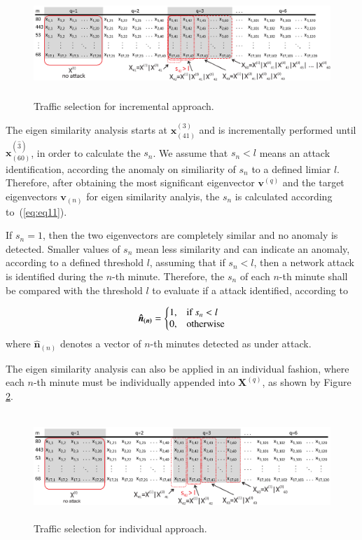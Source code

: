 \documentclass[review]{elsarticle}
\providecommand{\DIFaddtex}[1]{{\protect\color{blue}\uwave{#1}}} %
\providecommand{\DIFaddbegin}{} %
\providecommand{\DIFaddend}{} %
\providecommand{\DIFadd}[1]{\texorpdfstring{\DIFaddtex{#1}}{#1}} %
\begin{document}
\begin{figure}[h!]
     \includegraphics[height=4cm, width=12.4cm]{results/figures/incremental.eps}
     \caption{Traffic selection for incremental approach.}
     \label{fig:fig8}
\end{figure}

The eigen similarity analysis starts at $\boldsymbol{x}^{(3)}_{(41)}$ and is incrementally performed until $\boldsymbol{x}^{(\hat{3})}_{(60)}$, in order to calculate the $s_n$. We assume that $s_n < l$ means an attack identification, according the anomaly on similiarity of $s_n$ to a defined limiar $l$. Therefore, after obtaining the most significant eigenvector $\boldsymbol{v}^{(q)}$ and the target eigenvectors $\boldsymbol{v}_{(n)}$ for eigen similarity analyis, the $s_n$ is calculated according to~(\ref{eq:eq11}).

If $s_n = 1$, then the two eigenvectors are completely similar and no anomaly is detected. Smaller values of $s_n$ mean less similarity and can indicate an anomaly, according to a defined 
threshold $l$, assuming that if $s_n < l$, then a network attack is identified during the $n$-th minute. Therefore, the $s_n$ of each $n$-th minute shall be compared with the threshold $l$ to evaluate if a attack \DIFaddbegin \DIFadd{is }\DIFaddend identified, according to

\begin{equation}\label{eq:eq14}
  \boldsymbol{\hat{n}_{(n)}}=\left\{
  \begin{array}{@{}ll@{}}
    1, & \text{if}\ s_n < l \\
    0, & \text{otherwise}
  \end{array}\right.
\end{equation}
where $\boldsymbol{\hat{n}}_{(n)}$ denotes a vector of $n$-th minutes detected as under attack.

The eigen similarity analysis can also be applied in an individual fashion, where each $n$-th minute must be individually appended into $\boldsymbol{X}^{(q)}$, as shown by Figure \ref{fig:fig9}.

\begin{figure}[h!]
     \includegraphics[height=4cm, width=12.4cm]{results/figures/individualized.eps}
     \caption{Traffic selection for individual approach.}
     \label{fig:fig9}
\end{figure}
\end{document}
